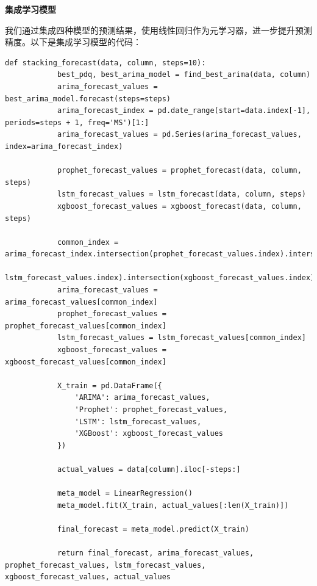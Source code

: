 \documentclass[a4paper]{article}
\begin{document}
	\textbf{集成学习模型}

	我们通过集成四种模型的预测结果，使用线性回归作为元学习器，进一步提升预测精度。以下是集成学习模型的代码：
	\begin{lstlisting}[caption={Python Example}, label={lst:example}]
		def stacking_forecast(data, column, steps=10):
			best_pdq, best_arima_model = find_best_arima(data, column)
			arima_forecast_values = best_arima_model.forecast(steps=steps)
			arima_forecast_index = pd.date_range(start=data.index[-1], periods=steps + 1, freq='MS')[1:]
			arima_forecast_values = pd.Series(arima_forecast_values, index=arima_forecast_index)

			prophet_forecast_values = prophet_forecast(data, column, steps)
			lstm_forecast_values = lstm_forecast(data, column, steps)
			xgboost_forecast_values = xgboost_forecast(data, column, steps)

			common_index = arima_forecast_index.intersection(prophet_forecast_values.index).intersection(
				lstm_forecast_values.index).intersection(xgboost_forecast_values.index)
			arima_forecast_values = arima_forecast_values[common_index]
			prophet_forecast_values = prophet_forecast_values[common_index]
			lstm_forecast_values = lstm_forecast_values[common_index]
			xgboost_forecast_values = xgboost_forecast_values[common_index]

			X_train = pd.DataFrame({
				'ARIMA': arima_forecast_values,
				'Prophet': prophet_forecast_values,
				'LSTM': lstm_forecast_values,
				'XGBoost': xgboost_forecast_values
			})

			actual_values = data[column].iloc[-steps:]

			meta_model = LinearRegression()
			meta_model.fit(X_train, actual_values[:len(X_train)])

			final_forecast = meta_model.predict(X_train)

			return final_forecast, arima_forecast_values, prophet_forecast_values, lstm_forecast_values, xgboost_forecast_values, actual_values

	\end{lstlisting}
\end{document}
